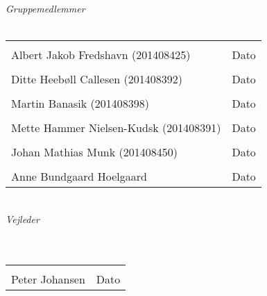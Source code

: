 \begin{vplace}[0.6]
{\large \textit{Gruppemedlemmer}}
\\
\\

\noindent \begin{tabular}{ll}
	\makebox[3in]{\hrulefill} & \makebox[1.5in]{\hrulefill}\\
	Albert Jakob Fredshavn (201408425) & Dato\\[7ex]
	\makebox[3in]{\hrulefill} & \makebox[1.5in]{\hrulefill}\\
	Ditte Heebøll Callesen (201408392) & Dato\\[7ex]
	\makebox[3in]{\hrulefill} & \makebox[1.5in]{\hrulefill}\\
	Martin Banasik  (201408398) & Dato\\[7ex]
	\makebox[3in]{\hrulefill} & \makebox[1.5in]{\hrulefill}\\
	Mette Hammer Nielsen-Kudsk  (201408391) & Dato\\[7ex]
	\makebox[3in]{\hrulefill} & \makebox[1.5in]{\hrulefill}\\
	Johan Mathias Munk  (201408450) & Dato\\[7ex]
	\makebox[3in]{\hrulefill} & \makebox[1.5in]{\hrulefill}\\
	Anne Bundgaard Hoelgaard & Dato\\[7ex]
	
	
\end{tabular}
\\
{\large \textit{Vejleder}}
\\
\\
\\
\noindent \begin{tabular}{ll}
	\makebox[3.0in]{\hrulefill} & \makebox[1.5in]{\hrulefill}\\
	Peter Johansen & Dato\\[8ex]
\end{tabular}
\end{vplace}